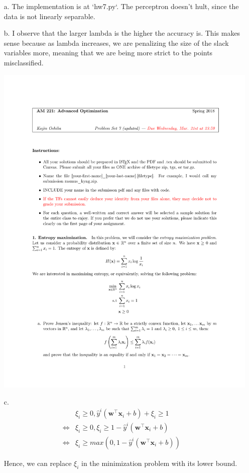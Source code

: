 \documentclass[11pt]{article}
\theoremstyle{remark}
\newcommand{\bx}{\mathbf{x}}
\newcommand{\bw}{\mathbf{w}}
\begin{document}
\color{blue}
\begin{itemize}
\item[a.]
The implementation is at `hw7.py`.
The perceptron doesn't hult, since the data is not linearly separable.

\item[b.]
I observe that the larger lambda is the higher the accuracy is. This makes sense because as lambda increases, we are penalizing the size of the slack variables more, meaning that we are being more strict to the points misclassified.

\includegraphics{hw7}

\item[c.]
\begin{align*}
& \xi_i \geq 0, \hat{y}^i(\bw^\intercal \bx_i + b)+\xi_i \geq 1 &\\
\Leftrightarrow & \xi_i \geq 0, \xi_i \geq 1 - \hat{y}^i(\bw^\intercal \bx_i + b)&\\
\Leftrightarrow & \xi_i \geq max(0, 1- \hat{y}^i(\bw^\intercal \bx_i + b))
\end{align*}

Hence, we can replace $\xi_i$ in the minimization problem with its lower bound.

\end{itemize}
\color{black}
\end{document}

